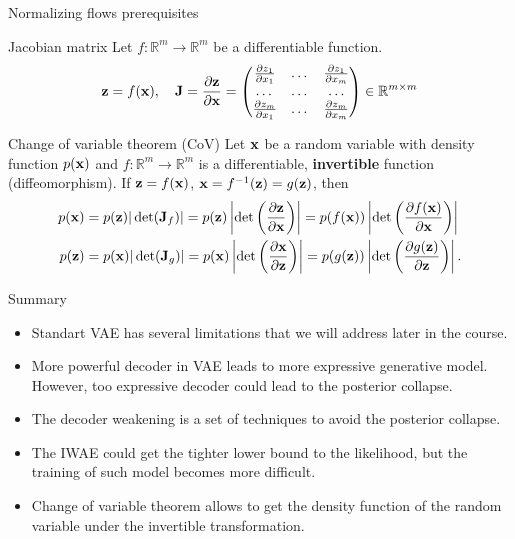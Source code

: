 \begin{frame}{Normalizing flows prerequisites}
	\begin{block}{Jacobian matrix}
		Let $f: \mathbb{R}^m \rightarrow \mathbb{R}^m$ be a differentiable function.
		\[
			\mathbf{z} = f(\mathbf{x}), \quad 
			\mathbf{J} =  \frac{\partial \mathbf{z}}{\partial \mathbf{x}} =
			\begin{pmatrix}
				\frac{\partial z_1}{\partial x_1} & \dots & \frac{\partial z_1}{\partial x_m} \\
				\dots & \dots & \dots \\ 
				\frac{\partial z_m}{\partial x_1} & \dots & \frac{\partial z_m}{\partial x_m}
			\end{pmatrix} \in \mathbb{R}^{m \times m}
		\]
		\vspace{-0.3cm}
	\end{block}
	\begin{block}{Change of variable theorem (CoV)}
		Let $\mathbf{x}$ be a random variable with density function $p(\mathbf{x})$ and $f: \mathbb{R}^m \rightarrow \mathbb{R}^m$ is a differentiable, \textbf{invertible} function (diffeomorphism). If $\mathbf{z} = f(\mathbf{x})$, $\mathbf{x} = f^{-1}(\mathbf{z}) = g(\mathbf{z})$, then
		\begin{align*}
			p(\mathbf{x}) &= p(\mathbf{z}) |\det(\mathbf{J}_f)| = p(\mathbf{z}) \left|\det \left(  \frac{\partial \mathbf{z}}{\partial \mathbf{x}} \right) \right| = p(f(\mathbf{x})) \left|\det \left(  \frac{\partial f(\mathbf{x})}{\partial \mathbf{x}} \right) \right| \\
			p(\mathbf{z}) &= p(\mathbf{x}) |\det(\mathbf{J}_g)|= p(\mathbf{x}) \left|\det \left(  \frac{\partial \mathbf{x}}{\partial \mathbf{z}} \right) \right| = p(g(\mathbf{z})) \left|\det \left(  \frac{\partial g(\mathbf{z})}{\partial \mathbf{z}} \right) \right|.
		\end{align*}
		\vspace{-0.5cm}
	\end{block}
\end{frame}
\begin{frame}{Summary}
	\begin{itemize}
		\item Standart VAE has several limitations that we will address later in the course.
		\vfill
		\item More powerful decoder in VAE leads to more expressive generative model. However, too expressive decoder could lead to the posterior collapse.
		\vfill
		\item The decoder weakening is a set of techniques to avoid the posterior collapse.
		\vfill
		\item The IWAE could get the tighter lower bound to the likelihood, but the training of such model becomes more difficult.
		\vfill
		\item Change of variable theorem allows to get the density function of the random variable under the invertible transformation.
	\end{itemize}
\end{frame}
 
